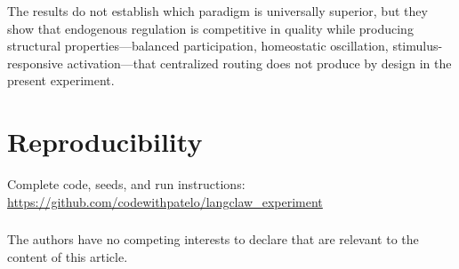 \documentclass{llncs}
\begin{document}
The results do not establish which paradigm is universally superior, but
they show that endogenous regulation is competitive in quality while
producing structural properties---balanced participation, homeostatic
oscillation, stimulus-responsive activation---that centralized routing does
not produce by design in the present experiment.

\section*{Reproducibility}

Complete code, seeds, and run instructions:
\url{https://github.com/codewithpatelo/langclaw_experiment}

\begin{credits}
\subsubsection{\discintname}
The authors have no competing interests to declare that are relevant to the
content of this article.
\end{credits}

\printbibliography
\end{document}

